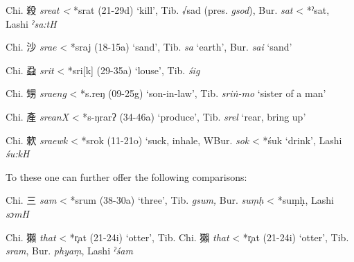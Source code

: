 \begin{description} \item
Chi. 殺  \emph{sreat \textless{} }*srat (21-29d) `kill', Tib. √sad (pres. {} \emph{gsod}), Bur. {} \emph{sat} \textless{} *ˀsat, Lashi
 \emph{ˀsa:tH}
\item
Chi. 沙  \emph{srae} \textless{} *s{}raj (18-15a) `sand', Tib. {} \emph{sa} `earth', Bur. {} \emph{sai} `sand'
\item
Chi. 蝨  \emph{srit} \textless{} *sri{[}k] (29-35a) `louse', Tib. {} \emph{śig}
\item
Chi. 甥  \emph{sraeng} \textless{} *s.reŋ (09-25g) `son-in-law', Tib.
{} \emph{sriṅ-mo} `sister of a man'
\item Chi. 產  \emph{sreanX} \textless{} *s-ŋrarʔ (34-46a) `produce', Tib.
{} \emph{srel} `rear, bring up'
\item
Chi. 欶  \emph{sraewk} \textless{} *s{}rok (11-21o) `suck, inhale, WBur. {} \emph{sok} \textless{} *śuk `drink', Lashi  \emph{śu:kH}
\end{description}

To these one can further offer the following comparisons:

\begin{description} \item
Chi. 三  \emph{sam} \textless{} *srum (38-30a) `three', Tib. {} \emph{gsum, }Bur. {} \emph{suṃḥ} \textless{} *suṃḥ, Lashi  \emph{sɔmH}

\item
Chi. 獺  \emph{that} \textless{} *r̥{}at (21-24i) `otter', Tib.
\protect\hypertarget{anchor-50}{}{}Chi. 獺  \emph{that} \textless{} *r̥{}at
(21-24i) `otter', Tib. {} \emph{sram}, Bur. {} \emph{phyaṃ}, Lashi
 \emph{ˀśam}
\end{description}

